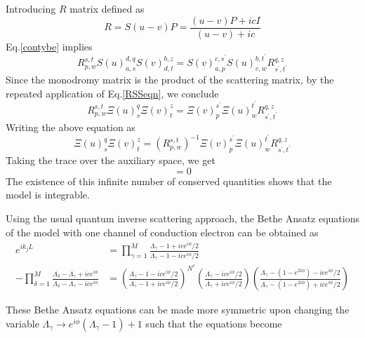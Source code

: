 \documentclass[aps,  prb,twocolumn,
  superscriptaddress,  floatfix,  10pt         
]{revtex4-2}
\begin{document}
Introducing $R$ matrix defined as
\begin{equation}
R=S(u-v) P=\frac{(u-v) P+i c I}{(u-v)+i c}
\end{equation} 
Eq.\eqref{contybe} implies 
\begin{equation}
R_{p, w}^{s, t} S(u)_{a, s}^{d, q} S(v)_{d, t}^{b, z}=S(v)_{a, p}^{c, s^{\prime}} S(u)_{c, w}^{b, t^{\prime}}R_{s^{\prime}, t^{\prime}}^{q, z}
\label{RSSeqn}
\end{equation}
Since the monodromy matrix is the product of the scattering matrix, by the repeated application of Eq.\eqref{RSSeqn}, we conclude
\begin{equation}
R_{p, w}^{s, t} \Xi(u)_{s}^{q} \Xi(v)_{t}^{z}=\Xi(v)_{p}^{s^{\prime}} \Xi(u)_{w}^{t^{\prime}} R_{s^{\prime}, t^{\prime}}^{q, z}
\end{equation}
Writing the above equation as
\begin{equation}
\Xi(u)_{s}^{q} \Xi(v)_{t}^{z}=\left(R_{p, w}^{s, t}\right)^{-1} \Xi(v)_{p}^{s^{\prime}} \Xi(u)_{w}^{t^{\prime}} R_{s^{\prime}, t^{\prime}}^{q, z}
\label{rsisi}
\end{equation}
Taking the trace over the auxiliary space, we get
\begin{equation}
[\mathcal{T}(u),\mathcal{T}(v)]=0
\end{equation}
The existence of this infinite number of conserved quantities shows that the model is integrable.

Using the usual quantum inverse scattering approach, the Bethe Ansatz equations of the model with one channel of conduction electron can be obtained as
\begin{align}
e^{i k_{j} L}&=\prod_{\gamma=1}^{M} \frac{\Lambda_{\gamma}-1+i ce^{i\phi} / 2}{\Lambda_{\gamma}-1-i ce^{i\phi} / 2}\label{momentacond}\\
-\prod_{\delta=1}^{M} \frac{\Lambda_{\delta}-\Lambda_{\gamma}+i ce^{i\phi}}{\Lambda_{\delta}-\Lambda_{\gamma}-i ce^{i\phi}}&=\left(\frac{\Lambda_{\gamma}-1-i ce^{i\phi} / 2}{\Lambda_{\gamma}-1+i ce^{i\phi} / 2}\right)^{N^{e}}\left(\frac{\Lambda_{\gamma}-i ce^{i\phi}/ 2}{\Lambda_{\gamma}+i ce^{i\phi}/ 2}\right)\left(\frac{\Lambda_{\gamma}-(1-e^{2i\phi})-i ce^{i\phi}/ 2}{\Lambda_{\gamma}-(1-e^{2i\phi})+i ce^{i\phi}/ 2}\right)\label{unwantedterms}
\end{align}

These Bethe Ansatz equations can be made more symmetric upon changing the variable $\Lambda_\gamma\to e^{i\phi}(\Lambda_\gamma-1)+1$ such that the equations become
\end{document}
